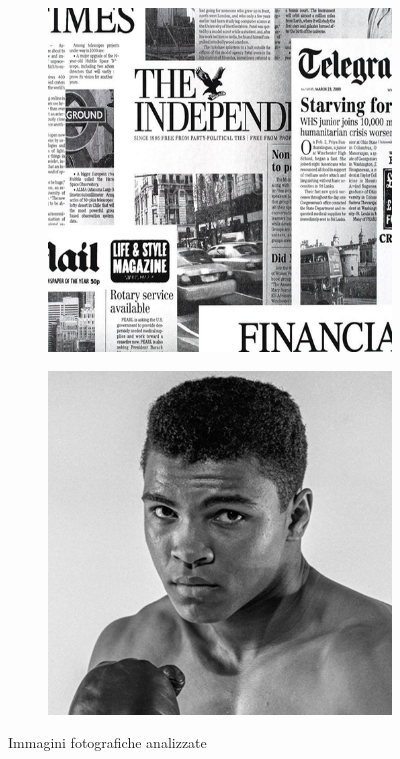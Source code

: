 \begin{figure}[h]
    \centering
    \begin{subfigure}{0.5\textwidth}
        \centering
        \includegraphics[width=0.5\linewidth]{./img/giornale.png}\label{fig:giornale}
    \end{subfigure}\hfill
    \begin{subfigure}{0.5\textwidth}
        \centering
        \includegraphics[width=0.5\linewidth]{./img/pugile.png}\label{fig:pugile}
    \end{subfigure}
    
    \caption{Immagini fotografiche analizzate}
\end{figure}
    